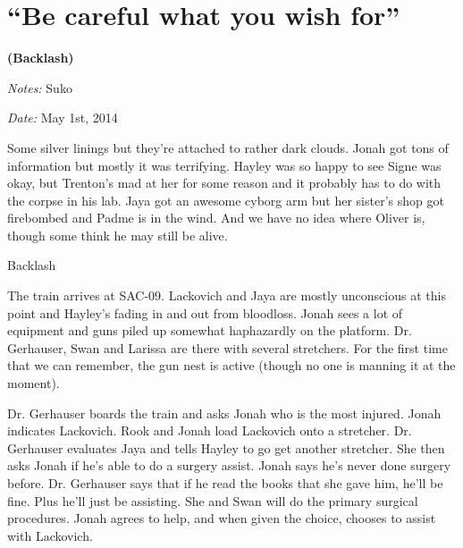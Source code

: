 \setcounter{chapter}{ 23 }
\chapter{\textbf{``Be careful what you wish for''} }




\begin{center}
 {\LARGE \textbf{(Backlash)} } 
\end{center}




\textit{Notes:} Suko

\textit{Date:} May 1st, 2014



Some silver linings but they're attached to rather dark clouds.  Jonah got tons of information but mostly it was terrifying. Hayley was so happy to see Signe was okay, but Trenton's mad at her for some reason and it probably has to do with the corpse in his lab.  Jaya got an awesome cyborg arm but her sister's shop got firebombed and Padme is in the wind.  And we have no idea where Oliver is, though some think he may still be alive.



\noindent\hrulefill





 {\LARGE Backlash } 



The train arrives at SAC-09.  Lackovich and Jaya are mostly unconscious at this point and Hayley's fading in and out from bloodloss.  Jonah sees a lot of equipment and guns piled up somewhat haphazardly on the platform. Dr. Gerhauser, Swan and Larissa are there with several stretchers.  For the first time that we can remember, the gun nest is active (though no one is manning it at the moment).



Dr. Gerhauser boards the train and asks Jonah who is the most injured.  Jonah indicates Lackovich.  Rook and Jonah load Lackovich onto a stretcher.  Dr. Gerhauser evaluates Jaya and tells Hayley to go get another stretcher.  She then asks Jonah if he's able to do a surgery assist.  Jonah says he's never done surgery before.  Dr. Gerhauser says that if he read the books that she gave him, he'll be fine.  Plus he'll just be assisting.  She and Swan will do the primary surgical procedures.  Jonah agrees to help, and when given the choice, chooses to assist with Lackovich.

